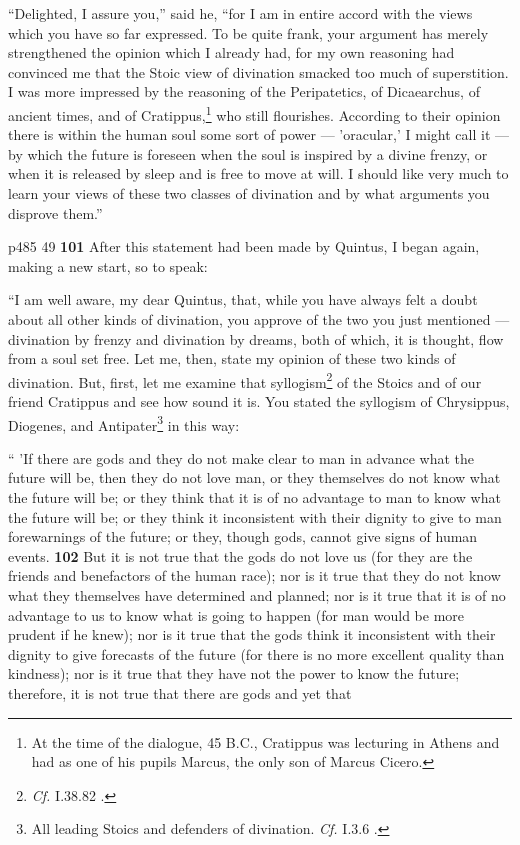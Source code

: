 ``Delighted, I assure you,'' said he, ``for I am in entire accord with the views which you have so far expressed. To be quite frank, your argument has merely strengthened the opinion which I already had, for my own reasoning had convinced me that the Stoic view of divination smacked too much of superstition. I was more impressed by the reasoning of the Peripatetics, of Dicaearchus, of ancient times, and of Cratippus,\texthebrew{}\footnote{At the time of the dialogue, 45 B.C., Cratippus was lecturing in Athens and had as one of his pupils Marcus, the only son of Marcus Cicero.

} who still flourishes. According to their opinion there is within the human soul some sort of power \texthebrew{—} 'oracular,' I might call it \texthebrew{—} by which the future is foreseen when the soul is inspired by a divine frenzy, or when it is released by sleep and is free to move at will. I should like very much to learn your views of these two classes of divination and by what arguments you disprove them.''

p485
49
\textbf{101} After this statement had been made by Quintus, I began again, making a new start, so to speak:

``I am well aware, my dear Quintus, that, while you have always felt a doubt about all other kinds of divination, you approve of the two you just mentioned \texthebrew{—} divination by frenzy and divination by dreams, both of which, it is thought, flow from a soul set free. Let me, then, state my opinion of these two kinds of divination. But, first, let me examine that syllogism\texthebrew{}\footnote{\emph{Cf.}
I.38.82 .

} of the Stoics and of our friend Cratippus and see how sound it is. You stated the syllogism of Chrysippus, Diogenes, and Antipater\texthebrew{}\footnote{All leading Stoics and defenders of divination. \emph{Cf.}
I.3.6 .

} in this way:

`` 'If there are gods and they do not make clear to man in advance what the future will be, then they do not love man, or they themselves do not know what the future will be; or they think that it is of no advantage to man to know what the future will be; or they think it inconsistent with their dignity to give to man forewarnings of the future; or they, though gods, cannot give signs of human events. \textbf{102} But it is not true that the gods do not love us (for they are the friends and benefactors of the human race); nor is it true that they do not know what they themselves have determined and planned; nor is it true that it is of no advantage to us to know what is going to happen (for man would be more prudent if he knew); nor is it true that the gods think it inconsistent with their dignity to give forecasts of the future (for there is no more excellent quality than kindness); nor is it true that they have not the power to know the future; therefore, it is not true that there are gods and yet that

